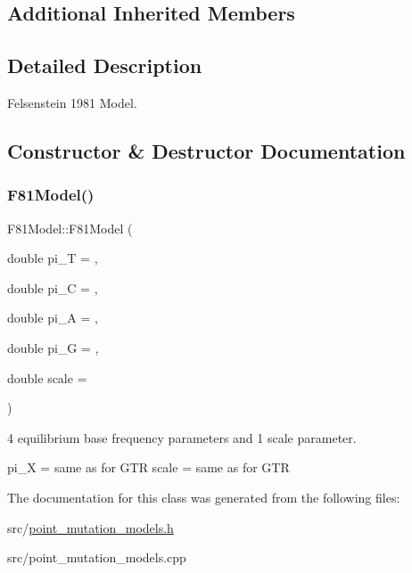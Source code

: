 \subsection*{Additional Inherited Members}


\subsection{Detailed Description}
Felsenstein 1981 Model. 

\subsection{Constructor \& Destructor Documentation}
\mbox{\label{classretrocombinator_1_1F81Model_a80c3357497cdc6b91ff4c408750b47bb}} 
\subsubsection{\texorpdfstring{F81\+Model()}{F81Model()}}
{\footnotesize\ttfamily F81\+Model\+::\+F81\+Model (\begin{DoxyParamCaption}\item[{double}]{pi\+\_\+T = {},  }\item[{double}]{pi\+\_\+C = {},  }\item[{double}]{pi\+\_\+A = {},  }\item[{double}]{pi\+\_\+G = {},  }\item[{double}]{scale = {} }\end{DoxyParamCaption})}



4 equilibrium base frequency parameters and 1 scale parameter. 

pi\+\_\+X = same as for G\+TR scale = same as for G\+TR 

The documentation for this class was generated from the following files\+:\begin{DoxyCompactItemize}
\item 
src/\hyperlink{point__mutation__models_8h}{point\+\_\+mutation\+\_\+models.\+h}\item 
src/point\+\_\+mutation\+\_\+models.\+cpp\end{DoxyCompactItemize}
